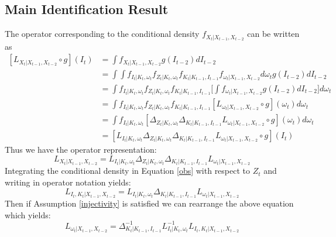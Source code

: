 \documentclass{article}
\begin{document}
\subsection*{Main Identification Result}
The operator corresponding to the conditional density $f_{X_{t}|X_{t-1}, X_{t-2}}$ can be written as
\begin{equation*}
\begin{split}
[L_{X_{t}|X_{t-1}, X_{t-2}}\circ g](I_{t})&=\int f_{X_{t}|X_{t-1}, X_{t-2}}g(I_{t-2})dI_{t-2}\\
&=\int\int f_{I_{t}|K_{t}, \omega_{t}}f_{Z_{t}|K_{t}, \omega_{t}}f_{K_{t}|K_{t-1}, I_{t-1}}f_{\omega_{t}|X_{t-1}, X_{t-2}}d\omega_{t}g(I_{t-2})dI_{t-2}\\
&=\int f_{I_{t}|K_{t}, \omega_{t}}f_{Z_{t}|K_{t}, \omega_{t}}f_{K_{t}|K_{t-1}, I_{t-1}}\Bigg[\int f_{\omega_{t}|X_{t-1}, X_{t-2}}g(I_{t-2})dI_{t-2}\Bigg]d\omega_{t}\\
&=\int f_{I_{t}|K_{t}, \omega_{t}}f_{Z_{t}|K_{t}, \omega_{t}}f_{K_{t}|K_{t-1}, I_{t-1}}[L_{\omega_{t}|X_{t-1}, X_{t-2}}\circ g](\omega_{t})d\omega_{t}\\
&=\int f_{I_{t}|K_{t}, \omega_{t}}[\Delta_{Z_{t}|K_{t}, \omega_{t}}\Delta_{K_{t}|K_{t-1}, I_{t-1}}L_{\omega_{t}|X_{t-1}, X_{t-2}}\circ g](\omega_{t})d\omega_{t}\\
&=[L_{I_{t}|K_{t}, \omega_{t}}\Delta_{Z_{t}|K_{t}, \omega_{t}}\Delta_{K_{t}|K_{t-1}, I_{t-1}}L_{\omega_{t}|X_{t-1}, X_{t-2}}\circ g](I_{t})
\end{split}
\end{equation*}
Thus we have the operator representation:
\begin{equation*}
L_{X_{t}|X_{t-1}, X_{t-2}}=L_{I_{t}|K_{t}, \omega_{t}}\Delta_{Z_{t}|K_{t}, \omega_{t}}\Delta_{K_{t}|K_{t-1}, I_{t-1}}L_{\omega_{t}|X_{t-1}, X_{t-2}}
\end{equation*}
Integrating the conditional density in Equation \eqref{obs} with respect to $Z_{t}$ and writing in operator notation yields:
\begin{equation*}
L_{I_{t}, K_{t}|X_{t-1}, X_{t-2}}=L_{I_{t}|K_{t}, \omega_{t}}\Delta_{K_{t}|K_{t-1}, I_{t-1}}L_{\omega_{t}|X_{t-1}, X_{t-2}}
\end{equation*}
Then if Assumption \eqref{injectivity} is satisfied we can rearrange the above equation which yields:
\begin{equation*}
L_{\omega_{t}|X_{t-1}, X_{t-2}}=\Delta^{-1}_{K_{t}|K_{t-1}, I_{t-1}}L^{-1}_{I_{t}|K_{t}, \omega_{t}}L_{I_{t}, K_{t}|X_{t-1}, X_{t-2}}
\end{equation*}
\end{document}
